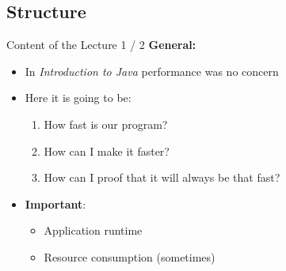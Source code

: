 \subsection{Structure}

\begin{frame}{Content of the Lecture 1 / 2}
  \textbf{General:}
  \begin{itemize}
    \item
      In \textit{Introduction to Java} performance was no concern
    \item
      Here it is going to be:
      \begin{enumerate}
        \item
          How fast is our program?
        \item
          How can I make it faster?
        \item
          How can I proof that it will always be that fast?
      \end{enumerate}
    \item
      \textbf{Important}:
      \begin{itemize}
        \item
          Application runtime
        \item
          Resource consumption (sometimes)
      \end{itemize}
  \end{itemize}
\end{frame}


